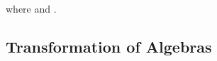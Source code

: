 \begin{code}
\>[2]\AgdaSpace{}%
\AgdaSymbol{:}\AgdaSpace{}%
\AgdaSpace{}%
\AgdaSymbol{\{}\AgdaSpace{}%
\AgdaSymbol{\}}\AgdaSpace{}%
\AgdaSpace{}%
\AgdaSymbol{(}\AgdaSpace{}%
\AgdaSymbol{:}\AgdaSpace{}%
\AgdaSpace{}%
\AgdaSymbol{(}\AgdaSpace{}%
\AgdaOperator{\AgdaInductiveConstructor{,}}\AgdaSpace{}%
\AgdaSymbol{))}\AgdaSpace{}%
\AgdaSpace{}%
\AgdaSpace{}%
\AgdaSpace{}%
\AgdaSpace{}%
\AgdaSpace{}%
\<%
\\
%
\>[2]\AgdaSpace{}%
\AgdaSpace{}%
\AgdaSymbol{=}\AgdaSpace{}%
\AgdaSpace{}%
\AgdaSpace{}%
\AgdaSpace{}%
\AgdaSpace{}%
\AgdaOperator{\AgdaInductiveConstructor{,}}\AgdaSpace{}%
\AgdaSpace{}%
\<%
\\
%
\>[2]\AgdaSpace{}%
\AgdaSpace{}%
\AgdaSymbol{=}\AgdaSpace{}%
\AgdaSpace{}%
\AgdaSpace{}%
\AgdaSpace{}%
\AgdaSpace{}%
\AgdaOperator{\AgdaInductiveConstructor{,}}\AgdaSpace{}%
\AgdaSpace{}%
\AgdaSpace{}%
\AgdaSpace{}%
\<%
\end{code}
\noindent where \AgdaSpace{}\AgdaSymbol{=}\AgdaInductiveConstructor{\#}\AgdaSpace{} and \AgdaSpace{}\AgdaSymbol{=}\AgdaSpace{}\AgdaInductiveConstructor{\#}\AgdaSpace{}\AgdaSymbol{(}\AgdaSpace{}\AgdaSymbol{)}.

\subsection{Transformation of Algebras}
\newcommand{\intSign}[2]{#1 ↝ #2}
\newcommand{\intTheo}[1]{\widetilde{\theory{#1}}}
\newcommand{\algTrans}[1]{\langle \mathcal{#1} \rangle}
\newcommand{\mapSort}[2]{#1\,#2}
\newcommand{\mapOp}[2]{#1\,#2}

